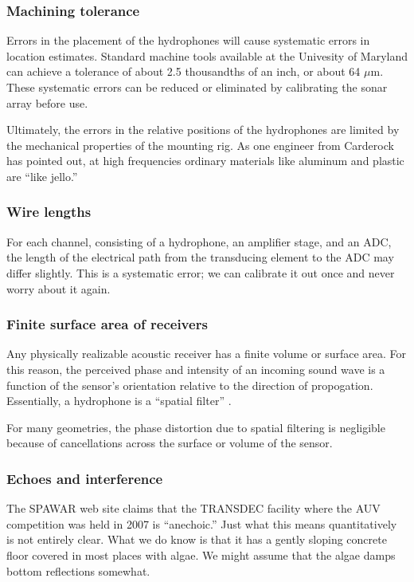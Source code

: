 \documentclass[10pt]{article}
\begin{document}
\subsubsection{Machining tolerance}

Errors in the placement of the hydrophones will cause systematic errors in location estimates.  Standard machine tools available at the Univesity of Maryland can achieve a tolerance of about 2.5 thousandths of an inch, or about 64 \(\mu\)m.  These systematic errors can be reduced or eliminated by calibrating the sonar array before use.

Ultimately, the errors in the relative positions of the hydrophones are limited by the mechanical properties of the mounting rig.  As one engineer from Carderock has pointed out, at high frequencies ordinary materials like aluminum and plastic are ``like jello.''

\subsubsection{Wire lengths}

For each channel, consisting of a hydrophone, an amplifier stage, and an ADC, the length of the electrical path from the transducing element to the ADC may differ slightly.  This is a systematic error; we can calibrate it out once and never worry about it again.

\subsubsection{Finite surface area of receivers}

Any physically realizable acoustic receiver has a finite volume or surface area.  For this reason, the perceived phase and intensity of an incoming sound wave is a function of the sensor's orientation relative to the direction of propogation.  Essentially, a hydrophone is a ``spatial filter'' \cite{Jensen}.

For many geometries, the phase distortion due to spatial filtering is negligible because of cancellations across the surface or volume of the sensor.

\subsubsection{Echoes and interference}

The SPAWAR web site claims that the TRANSDEC facility \cite{transdec-anechoic} where the AUV competition was held in 2007 is ``anechoic.''  Just what this means quantitatively is not entirely clear.  What we do know is that it has a gently sloping concrete floor covered in most places with algae.  We might assume that the algae damps bottom reflections somewhat.
\end{document}
